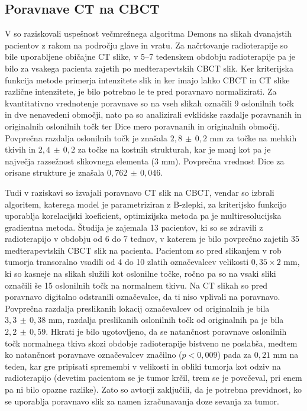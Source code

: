 \documentclass[journal]{IEEEtran}
\begin{document}
\subsection{Poravnave CT na CBCT}

V \cite{hou2011} so raziskovali uspešnost večmrežnega algoritma Demons na slikah dvanajstih pacientov z rakom na področju glave in vratu. Za načrtovanje radioterapije so bile uporabljene običajne CT slike, v 5--7 tedenskem obdobju radioterapije pa je bilo za vsakega pacienta zajetih po medterapevtskih CBCT slik. Ker kriterijska funkcija metode primerja intenzitete slik in ker imajo lahko CBCT in CT slike različne intenzitete, je bilo potrebno le te pred poravnavo normalizirati. Za kvantitativno vrednotenje poravnave so na vseh slikah označili 9 oslonilnih točk in dve nenavedeni območji, nato pa so analizirali evklidske razdalje poravnanih in originalnih oslonilnih točk ter Dice mero poravnanih in originalnih območij. Povprečna razdalja oslonilnih točk je znašala $2{,}8\,{\pm}\,0{,}2$ mm za točke na mehkih tkivih in $2{,}4\,{\pm}\,0{,}2$ za točke na kostnih strukturah, kar je manj kot pa je največja razsežnost slikovnega elementa ($3$ mm). Povprečna vrednost Dice za orisane strukture je znašala $0,762\,\pm\,0,046$.

Tudi v raziskavi \cite{mencarelli2014} so izvajali poravnavo CT slik na CBCT, vendar so izbrali algoritem, katerega model je parametriziran z B-zlepki, za kriterijsko funkcijo uporablja korelacijski koeficient, optimizijska metoda pa je multiresolucijska gradientna metoda. Študija je zajemala 13 pacientov, ki so se zdravili z radioterapijo v obdobju od 6 do 7 tednov, v katerem je bilo povprečno zajetih 35 medterapevtskih CBCT slik na pacienta. Pacientom so pred slikanjem v rob tumorja transoralno vsadili od 4 do 10 zlatih označevalcev velikosti $0{,}35\times 2$ mm, ki so kasneje na slikah služili kot oslonilne točke, ročno pa so na vsaki sliki označili še 15 oslonilnih točk na normalnem tkivu. Na CT slikah so pred poravnavo digitalno odstranili označevalce, da ti niso vplivali na poravnavo. Povprečna razdalja preslikanih lokacij označevalcev od originalnih je bila $3{,}3\,\pm\,0{,}38$ mm, razdalja preslikanih oslonilnih točk od originalnih pa je bila $2{,}2\,\pm\,0{,}59$. Hkrati je bilo ugotovljeno, da se natančnost poravnave oslonilnih točk normalnega tkiva skozi obdobje radioterapije bistveno ne poslabša, medtem ko natančnost poravnave označevalcev značilno ($p<0{,}009$) pada za $0{,}21$ mm na teden, kar gre pripisati spremembi v velikosti in obliki tumorja kot odziv na radioterapijo (devetim pacientom se je tumor krčil, trem se je povečeval, pri enem pa ni bilo opazne razlike). Zato so avtorji zaključili, da je potrebna previdnost, ko se uporablja poravnavo slik za namen izračunavanja doze sevanja za tumor.
\end{document}
